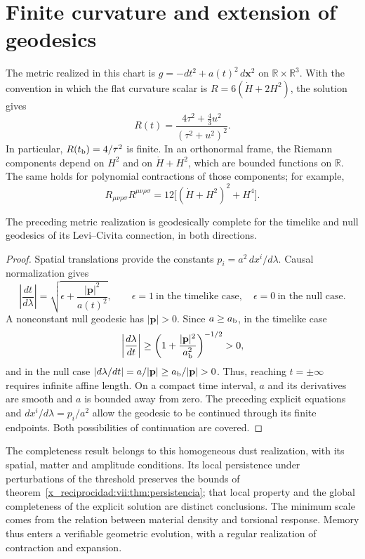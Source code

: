 \section{Finite curvature and extension of geodesics}
The metric realized in this chart is
\(g=-dt^2+a(t)^2\,d\mathbf x^2\) on
\(\mathbb R\times\mathbb R^3\). With the convention in which
the flat curvature scalar is \(R=6(\dot H+2H^2)\), the solution gives
\[
 R(t)=\frac{4\tau^2+\frac43u^2}{(\tau^2+u^2)^2}.
\]
In particular, \(R(t_{\rm b})=4/\tau^2\) is finite.
In an orthonormal frame, the Riemann components depend on
\(H^2\) and on \(\dot H+H^2\), which are bounded functions on
\(\mathbb R\). The same holds for polynomial contractions
of those components; for example,
\[
 R_{\mu\nu\rho\sigma}R^{\mu\nu\rho\sigma}
 =12\bigl[(\dot H+H^2)^2+H^4\bigr].
\]

\begin{proposition}
\label{x_reciprocidad:vii:prop:completitud-causal-polvo}
The preceding metric realization is geodesically complete
for the timelike and null geodesics of its Levi--Civita
connection, in both directions.
\end{proposition}
\begin{proof}
Spatial translations provide the constants
\(p_i=a^2\,dx^i/d\lambda\). Causal normalization gives
\[
 \left|\frac{dt}{d\lambda}\right|
 =\sqrt{\epsilon+\frac{|\mathbf p|^2}{a(t)^2}},
 \qquad \epsilon=1\ \text{in the timelike case},\quad
 \epsilon=0\ \text{in the null case}.
\]
A nonconstant null geodesic has \(|\mathbf p|>0\).
Since \(a\geq a_{\rm b}\), in the timelike case
\[
 \left|\frac{d\lambda}{dt}\right|
 \geq\left(1+\frac{|\mathbf p|^2}{a_{\rm b}^2}\right)^{-1/2}>0,
\]
and in the null case
\(\left|d\lambda/dt\right|=a/|\mathbf p|
 \geq a_{\rm b}/|\mathbf p|>0\).
Thus, reaching \(t=\pm\infty\) requires infinite affine length.
On a compact time interval, \(a\) and its derivatives are
smooth and \(a\) is bounded away from zero. The preceding explicit
equations and \(dx^i/d\lambda=p_i/a^2\) allow the
geodesic to be continued through its finite endpoints. Both
possibilities of continuation are covered.
\end{proof}

The completeness result belongs to this homogeneous dust
realization, with its spatial, matter and amplitude conditions. Its
local persistence under perturbations of the threshold preserves the bounds
of theorem~\ref{x_reciprocidad:vii:thm:persistencia}; that local property and the
global completeness of the explicit solution are distinct conclusions.
The minimum scale comes from the relation between material density and
torsional response. Memory thus enters a verifiable geometric
evolution, with a regular realization of contraction
and expansion.


